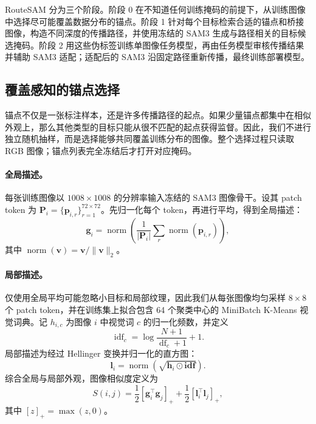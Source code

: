 \documentclass[UTF8,a4paper,10pt]{ctexart}
\begin{document}
RouteSAM 分为三个阶段。阶段 0 在不知道任何训练掩码的前提下，从训练图像中选择尽可能覆盖数据分布的锚点。阶段 1 针对每个目标检索合适的锚点和桥接图像，构造不同深度的传播路径，并使用冻结的 SAM3 生成与路径相关的目标候选掩码。阶段 2 用这些伪标签训练单图像任务模型，再由任务模型审核传播结果并辅助 SAM3 适配；适配后的 SAM3 沿固定路径重新传播，最终训练部署模型。

\subsection{覆盖感知的锚点选择}
\label{sec:anchor-selection-zh}

锚点不仅是一张标注样本，还是许多传播路径的起点。如果少量锚点都集中在相似外观上，那么其他类型的目标只能从很不匹配的起点获得监督。因此，我们不进行独立随机抽样，而是选择能够共同覆盖训练分布的图像。整个选择过程只读取 RGB 图像；锚点列表完全冻结后才打开对应掩码。

\paragraph{全局描述。}
每张训练图像以 $1008\times1008$ 的分辨率输入冻结的 SAM3 图像骨干。设其 patch token 为 $\mathbf{P}_i=\{\mathbf{p}_{i,r}\}_{r=1}^{72\times72}$。先归一化每个 token，再进行平均，得到全局描述：
\begin{equation}
\mathbf{g}_i=\operatorname{norm}\left(\frac{1}{|\mathbf{P}_i|}\sum_r
\operatorname{norm}(\mathbf{p}_{i,r})\right),
\end{equation}
其中 $\operatorname{norm}(\mathbf{v})=\mathbf{v}/\lVert\mathbf{v}\rVert_2$。

\paragraph{局部描述。}
仅使用全局平均可能忽略小目标和局部纹理，因此我们从每张图像均匀采样 $8\times8$ 个 patch token，并在训练集上拟合包含 64 个聚类中心的 MiniBatch K-Means 视觉词典。记 $h_{i,c}$ 为图像 $i$ 中视觉词 $c$ 的归一化频数，并定义
\begin{equation}
\operatorname{idf}_c=\log\frac{N+1}{\operatorname{df}_c+1}+1.
\end{equation}
局部描述为经过 Hellinger 变换并归一化的直方图：
\begin{equation}
\mathbf{l}_i=\operatorname{norm}\left(\sqrt{\mathbf{h}_i\odot\mathbf{idf}}\right).
\end{equation}
综合全局与局部外观，图像相似度定义为
\begin{equation}
S(i,j)=\frac{1}{2}\left[\mathbf{g}_i^{\top}\mathbf{g}_j\right]_+
+\frac{1}{2}\left[\mathbf{l}_i^{\top}\mathbf{l}_j\right]_+,
\end{equation}
其中 $[z]_+=\max(z,0)$。
\end{document}
